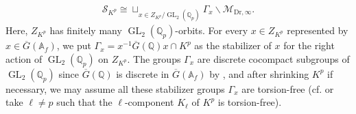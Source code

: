 \documentclass{article}
\theoremstyle{definition}
\def\calM{\mathcal{M}}
\def\calS{\mathcal{S}}
\def\bbA{\mathbb{A}}
\def\bbQ{\mathbb{Q}}
\def\bs{\backslash}
\def\isom{\cong}
\DeclareMathOperator{\GL}{GL}
\def\bar{\overline}
\def\Dr{\mathrm{Dr}}
\begin{document}
\begin{align}\label{uniformization}
    \calS_{K^p}\isom \sqcup_{x\in  Z_{K^p}/\GL_2(\bbQ_p) }\Gamma_x\bs \calM_{\Dr,\infty}.
\end{align} 
Here, $Z_{K^p}$ has finitely many $\GL_2(\bbQ_p)$-orbits. For every $x\in Z_{K^p}$ represented by $x\in \bar G(\bbA_f)$, we put $\Gamma_x=x^{-1}\bar G(\bbQ)x\cap K^p$ as the stabilizer of $x$ for the right action of $\GL_2(\bbQ_p)$ on $Z_{K^p}$. The groups $\Gamma_x$ are discrete cocompact subgroups of $\GL_2(\bbQ_p)$ since $\bar G(\bbQ)$ is discrete in $\bar G(\bbA_f)$ by \cite[Proposition 1.4]{gross1999algebraic}, and after shrinking $K^p$ if necessary, we may assume all these stabilizer groups $\Gamma_x$ are torsion-free (cf. \cite[5.4]{MR1141456} or take $\ell\neq p$ such that the $\ell$-component $K_{\ell}$ of $K^p$ is torsion-free).
\end{document}
